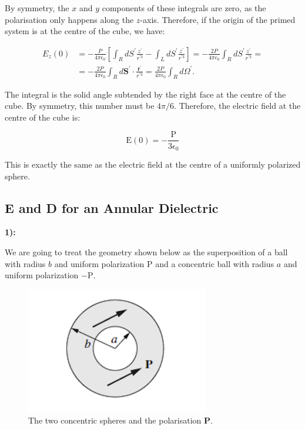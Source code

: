 By symmetry, the $x$ and $y$ components of these integrals are zero, as the polarisation only happens along the $z$-axis. Therefore, if the origin of the primed system is at the centre of the cube, we have:

\begin{equation}
	\begin{split}
		E_{z}(0) &=-\frac{P}{4 \pi \epsilon_{0}}\left[\int_{R} d S^{\prime} \frac{z^{\prime}}{r^{\prime 3}}-\int_{L} d S^{\prime} \frac{z^{\prime}}{r^{\prime 3}}\right]=-\frac{2 P}{4 \pi \epsilon_{0}} \int_{R} d S^{\prime} \frac{z^{\prime}}{r^{\prime 3}}= \\
		&=-\frac{2 P}{4 \pi \epsilon_{0}} \int_{R} d \mathbf{S}^{\prime} \cdot \frac{\mathbf{r}^{\prime}}{r^{\prime 3}}=\frac{2 P}{4 \pi \epsilon_{0}} \int_{R} d \Omega^{\prime} .
	\end{split}
\end{equation}

The integral is the solid angle subtended by the right face at the centre of the cube. By symmetry, this number must be $4 \pi / 6 .$ Therefore, the electric field at the centre of the cube is:

\begin{equation}
	\mathrm{E}(0)=-\frac{\mathrm{P}}{3 \epsilon_{0}}
\end{equation}

This is exactly the same as the electric field at the centre of a uniformly polarized sphere.


\subsection{E and D for an Annular Dielectric}\label{E and D for an Annular Dielectric}

\textbf{1):}

We are going to treat the geometry shown below as the superposition of a ball with radius $b$ and uniform polarization $\mathrm{P}$ and a concentric ball with radius $a$ and uniform polarization $-\mathrm{P}$.

\begin{figure}[h!]
	\includegraphics[width=8cm]{figures/PolarisatedBall.png}
	\centering
	\caption{The two concentric spheres and the polarisation $\mathbf{P}$.}
\end{figure}

